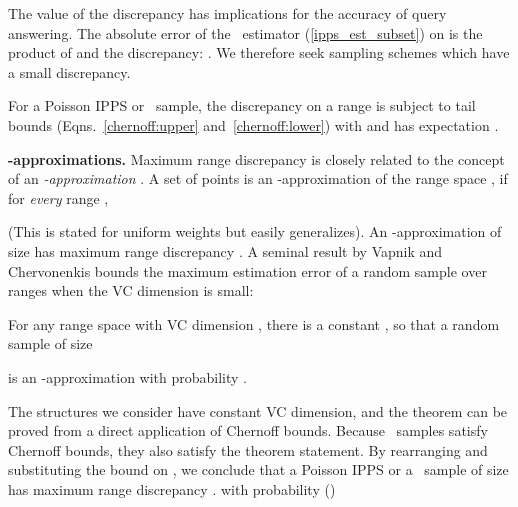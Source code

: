 \documentclass[11pt]{article}
\begin{document}
\smallskip
The value of the discrepancy has implications for the accuracy of
query answering. 
The absolute error of the \HT\ estimator (\ref{ipps_est_subset}) on  is
the product of  and the discrepancy: .
We therefore seek sampling schemes which have a small discrepancy. 

For a Poisson IPPS or \varopt\ sample, the discrepancy on a range  
is subject to tail bounds (Eqns.~\eqref{chernoff:upper}
and~\eqref{chernoff:lower}) with  and has expectation .

\medskip
\noindent
{\bf -approximations.}
Maximum range discrepancy 
is closely related to the concept of an 
{\em -approximation} \cite{VCepsapprox:1971}.  
A set of points  is an 
-approximation of the range space , if for
 {\em every} range ,

\smallskip
\centerline{
}

\smallskip
(This is stated for uniform weights but easily generalizes).
An -approximation of size  has 
maximum range discrepancy .  
A seminal result by Vapnik and Chervonenkis bounds the maximum
estimation error of a random sample over ranges when the VC dimension
is small: 
\begin{theorem} \label{VCapprox} 
For any range space with VC dimension , there is a constant , 
so that a random sample of size 

\noindent
 is an -approximation with probability .  
\end{theorem}
The structures we consider have constant VC dimension, and the theorem
can be proved from a direct application of Chernoff bounds. 
Because \varopt\ samples satisfy Chernoff bounds, they also satisfy
the theorem statement.  
By rearranging and substituting the bound on , 
we conclude that a Poisson IPPS or a \varopt\ sample of size  has
maximum
 range discrepancy  
.  
 with probability () 


\end{document}
